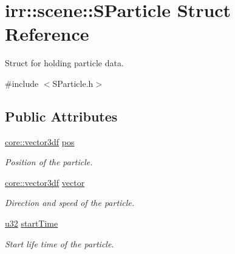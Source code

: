 \hypertarget{structirr_1_1scene_1_1SParticle}{}\section{irr\+:\+:scene\+:\+:S\+Particle Struct Reference}
\label{structirr_1_1scene_1_1SParticle}


Struct for holding particle data.  




{\ttfamily \#include $<$S\+Particle.\+h$>$}

\subsection*{Public Attributes}
\begin{DoxyCompactItemize}
\item 
\mbox{\label{structirr_1_1scene_1_1SParticle_a5f8e6fe3a892c8f734389dfcaf01fb05}} 
\hyperlink{namespaceirr_1_1core_ae6e2b2a6c552833ebbd5b7463d03586b}{core\+::vector3df} \hyperlink{structirr_1_1scene_1_1SParticle_a5f8e6fe3a892c8f734389dfcaf01fb05}{pos}
\begin{DoxyCompactList}\small\item\em Position of the particle. \end{DoxyCompactList}\item 
\mbox{\label{structirr_1_1scene_1_1SParticle_afaa96102f7effe71755e54c868e6eccd}} 
\hyperlink{namespaceirr_1_1core_ae6e2b2a6c552833ebbd5b7463d03586b}{core\+::vector3df} \hyperlink{structirr_1_1scene_1_1SParticle_afaa96102f7effe71755e54c868e6eccd}{vector}
\begin{DoxyCompactList}\small\item\em Direction and speed of the particle. \end{DoxyCompactList}\item 
\mbox{\label{structirr_1_1scene_1_1SParticle_aa546b47d4a54889e568a4c067816765c}} 
\hyperlink{namespaceirr_a0416a53257075833e7002efd0a18e804}{u32} \hyperlink{structirr_1_1scene_1_1SParticle_aa546b47d4a54889e568a4c067816765c}{start\+Time}
\begin{DoxyCompactList}\small\item\em Start life time of the particle. \end{DoxyCompactList}\item 

\end{DoxyCompactItemize}
